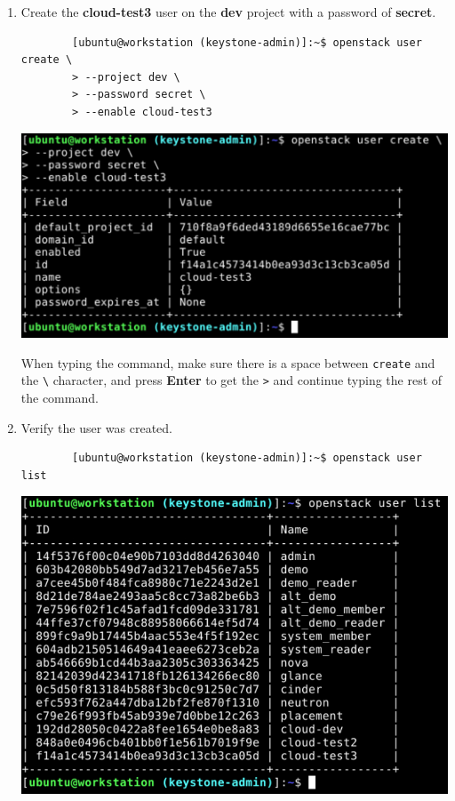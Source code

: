 \documentclass[letterpaper, 12pt]{article}
\begin{document}
\begin{enumerate}
    \item Create the \textbf{cloud-test3} user on the \textbf{dev} project with a password of \textbf{secret}.
    \begin{lstlisting}
        [ubuntu@workstation (keystone-admin)]:~$ openstack user create \
        > --project dev \
        > --password secret \
        > --enable cloud-test3
    \end{lstlisting}

    \begin{center}
        \includegraphics[width=\linewidth]{images/part4/step4.png}
    \end{center}

    \begin{tipbox}
        When typing the command, make sure there is a space between \texttt{create} and the \texttt{\textbackslash}
        character, and press \textbf{Enter} to get the \texttt{>} and continue typing the rest of the command.
    \end{tipbox}

    \item Verify the user was created.
    \begin{lstlisting}
        [ubuntu@workstation (keystone-admin)]:~$ openstack user list
    \end{lstlisting}

    \begin{center}
        \includegraphics[width=\linewidth]{images/part4/step5.png}
    \end{center}


\end{enumerate}
\end{document}

